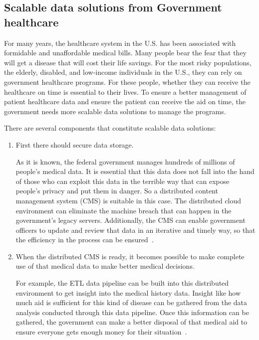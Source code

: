 \subsection{Scalable data solutions from Government healthcare}
For many years, the healthcare system in 
the U.S. has been associated with 
formidable and unaffordable medical bills. 
Many people bear the fear that 
they will get a disease that will cost their life 
savings. For the most risky 
populations, the elderly, disabled, and 
low-income individuals in the U.S., 
they can rely on government healthcare programs. 
For these people, 
whether they can receive the healthcare on time is 
essential to their lives. 
To ensure a better management of patient 
healthcare data and ensure 
the patient can receive the aid on time, 
the government needs more 
scalable data solutions to manage the programs. 

There are several components that constitute scalable data solutions:
\begin{enumerate}
	\item First there should secure data storage. 
	
	As it is known, the federal government manages 
	hundreds of millions of 
	people's medical data. 
	It is essential that this data does not fall into 
	the hand of those who can exploit this data 
	in the terrible way that 
	can expose people's privacy and put them in 
	danger. So a distributed 
	content management system (CMS) is 
	suitable in this case. The 
	distributed cloud environment can eliminate 
	the machine breach that 
	can happen in the government's legacy servers. 
	Additionally, the CMS can 
	enable government officers to update and 
	review that data in an 
	iterative and timely way, so that the efficiency 
	in the process can be 
	ensured~\cite{gov}.

	\item When the distributed CMS is ready, 
	it becomes possible to 
	make complete use of that medical data to 
	make better medical 
	decisions. 
	
For example, the ETL data pipeline can be built into this distributed 
environment to get insight into the medical history data. Insight like 
how much aid is sufficient for this kind of disease can be gathered 
from the data analysis conducted through this data pipeline. Once 
this information can be gathered, the government can make a better 
disposal of that medical aid to ensure everyone gets enough money
for their situation~\cite{ELT}.
\end{enumerate}

